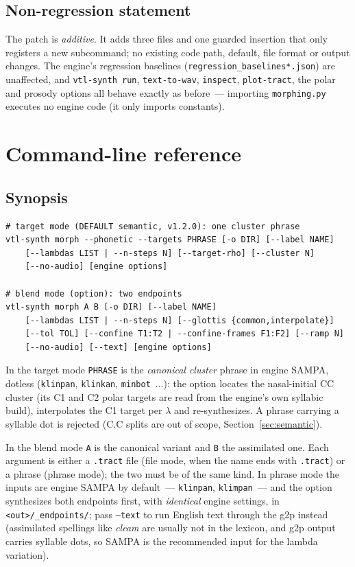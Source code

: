 \documentclass[11pt,a4paper]{article}
\newcommand{\lam}{\lambda}
\newcommand{\code}[1]{\texttt{#1}}
\newcommand{\sectref}[1]{Section~\ref{#1}}
\begin{document}
\subsection{Non-regression statement}

The patch is \emph{additive}.  It adds three files and one guarded
insertion that only registers a new subcommand; no existing code
path, default, file format or output changes.  The engine's
regression baselines (\code{regression\_baselines*.json}) are
unaffected, and \code{vtl-synth run}, \code{text-to-wav},
\code{inspect}, \code{plot-tract}, the polar and prosody options
all behave exactly as before~--- importing \code{morphing.py}
executes no engine code (it only imports constants).

\section{Command-line reference}\label{sec:cli}

\subsection{Synopsis}

\begin{lstlisting}[style=shell]
# target mode (DEFAULT semantic, v1.2.0): one cluster phrase
vtl-synth morph --phonetic --targets PHRASE [-o DIR] [--label NAME]
    [--lambdas LIST | --n-steps N] [--target-rho] [--cluster N]
    [--no-audio] [engine options]

# blend mode (option): two endpoints
vtl-synth morph A B [-o DIR] [--label NAME]
    [--lambdas LIST | --n-steps N] [--glottis {common,interpolate}]
    [--tol TOL] [--confine T1:T2 | --confine-frames F1:F2] [--ramp N]
    [--no-audio] [--text] [engine options]
\end{lstlisting}

In the target mode \code{PHRASE} is the \emph{canonical cluster}
phrase in engine SAMPA, dotless (\code{klinpan}, \code{klinkan},
\code{minbot}~...): the option locates the nasal-initial CC cluster
(its C1 and C2 polar targets are read from the engine's own
syllabic build), interpolates the C1 target per $\lam$ and
re-synthesizes.  A phrase carrying a syllable dot is rejected
(C.C splits are out of scope, \sectref{sec:semantic}).

In the blend mode \code{A} is the canonical variant and \code{B}
the assimilated one.  Each argument is either a \code{.tract} file
(file mode, when the name ends with \code{.tract}) or a phrase
(phrase mode); the two must be of the same kind.  In phrase mode the
inputs are engine SAMPA by default~--- \code{klinpan},
\code{klimpan}~--- and the option synthesizes both endpoints first,
with \emph{identical} engine settings, in \code{<out>/\_endpoints/};
pass \code{--text} to run English text through the g2p instead
(assimilated spellings like \emph{cleam} are usually not in the
lexicon, and g2p output carries syllable dots, so SAMPA is the
recommended input for the lambda variation).
\end{document}
